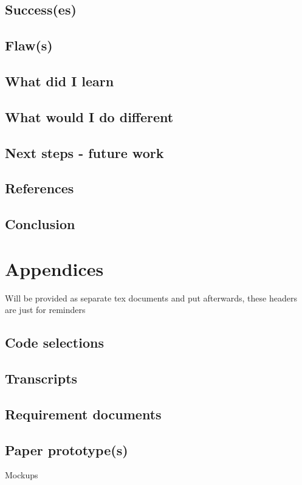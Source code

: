 \documentclass[]{report}
\begin{document}
\section{Success(es)}

\section{Flaw(s)}

\section{What did I learn}

\section{What would I do different}

\section{Next steps - future work}

\section{References}

{}



\section{Conclusion}

\chapter{Appendices}

Will be provided as separate tex documents and put afterwards, these headers are
just for reminders

\section{Code selections}

\section{Transcripts}

\section{Requirement documents}

\section{Paper prototype(s)}

Mockups\cite{site:mockups}
\end{document}
